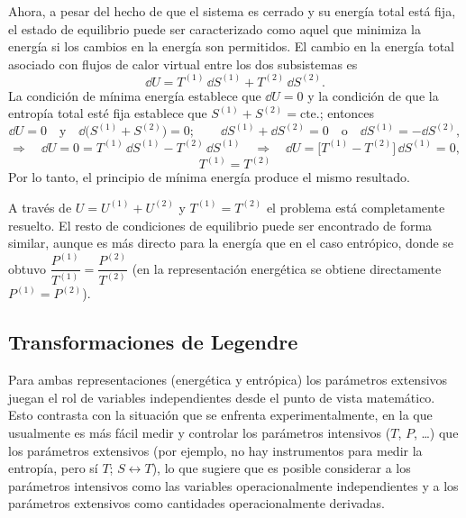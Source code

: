 Ahora, a pesar del hecho de que el sistema es cerrado y su energía total está fija, el estado de
equilibrio puede ser caracterizado como aquel que minimiza la energía si los cambios en la energía
son permitidos. El cambio en la energía total asociado con flujos de calor virtual entre los dos
subsistemas es
\begin{equation*}
  \dd U=T^{(1)}\,\dd S^{(1)}+T^{(2)}\,\dd S^{(2)}.
\end{equation*}
La condición de mínima energía establece que $\dd U=0$ y la condición de que la entropía total esté
fija establece que $S^{(1)}+S^{(2)}=\text{cte.}$; entonces
\begin{equation*}
  \dd U=0\quad\text{y}\quad\dd\bigl(S^{(1)}+S^{(2)}\bigr)=0;\qquad
  \dd S^{(1)}+\dd S^{(2)}=0\quad\text{o}\quad\dd S^{(1)}=-\dd S^{(2)},
\end{equation*}
\begin{equation*}
  \Longrightarrow\quad\dd U=0=T^{(1)}\,\dd S^{(1)}-T^{(2)}\,\dd S^{(1)}
  \quad\Longrightarrow\quad\dd U=\bigl[T^{(1)}-T^{(2)}\bigr]\,\dd S^{(1)}=0,
\end{equation*}
\begin{equation*}
  \boxed{T^{(1)}=T^{(2)}}
\end{equation*}
Por lo tanto, el principio de mínima energía produce el mismo resultado.

A través de $U=U^{(1)}+U^{(2)}$ y $T^{(1)}=T^{(2)}$ el problema está completamente resuelto. El resto de
condiciones de equilibrio puede ser encontrado de forma similar, aunque es más directo para la
energía que en el caso entrópico, donde se obtuvo $\dfrac{P^{(1)}}{T^{(1)}}=\dfrac{P^{(2)}}{T^{(2)}}$
(en la representación energética se obtiene directamente $P^{(1)}=P^{(2)}$).

\subsection*{Transformaciones de Legendre}

Para ambas representaciones (energética y entrópica) los parámetros extensivos juegan el rol de
variables independientes desde el punto de vista matemático. Esto contrasta con la situación que se
enfrenta experimentalmente, en la que usualmente es más fácil medir y controlar los parámetros
intensivos ($T$, $P$, \dots) que los parámetros extensivos (por ejemplo, no hay instrumentos para
medir la entropía, pero sí $T$; $S\leftrightarrow T$), lo que sugiere que es posible considerar a los
parámetros intensivos como las variables operacionalmente independientes y a los parámetros
extensivos como cantidades operacionalmente derivadas.

